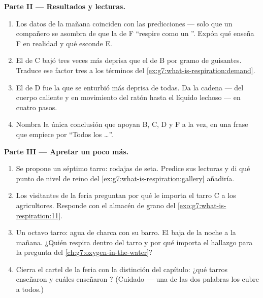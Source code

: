 \begin{problem}
\medskip\noindent\textbf{Parte II --- Resultados y lecturas.}
\begin{enumerate}[resume]
  \item Los datos de la mañana coinciden con las predicciones --- solo
        que un compañero se asombra de que la  de F ``respire
        como un ''. Expón qué enseña F en realidad y qué esconde E.
  \item El  de C bajó tres veces más deprisa que el de B por
        gramo de guisantes. Traduce ese factor tres a los términos del
        \cref{ex:g7:what-is-respiration:demand}.
  \item El  de D fue la que se enturbió más deprisa de
        todas. Da la cadena --- del cuerpo caliente y en movimiento del
        ratón hasta el líquido lechoso --- en cuatro pasos.
  \item Nombra la única conclusión que apoyan B, C, D y F a la vez, en
        una frase que empiece por ``Todos los \dots''.
\end{enumerate}

\medskip\noindent\textbf{Parte III --- Apretar un poco más.}
\begin{enumerate}[resume]
  \item Se propone un séptimo tarro: rodajas de seta. Predice sus
        lecturas y di qué punto de nivel de reino del
        \cref{ex:g7:what-is-respiration:gallery} añadiría.
  \item Los visitantes de la feria preguntan por qué le importa el
        tarro C a los agricultores. Responde con el almacén de grano
        del \cref{exo:g7:what-is-respiration:11}.
  \item Un octavo tarro: agua de charca con su barro. El  baja
        de la noche a la mañana. ¿Quién respira dentro del tarro y por
        qué importa el hallazgo para la pregunta del
        \cref{ch:g7:oxygen-in-the-water}?
  \item Cierra el cartel de la feria con la distinción del capítulo:
        ¿qué tarros enseñaron \emph{} y cuáles enseñaron
        \emph{}? (Cuidado --- una de las dos palabras los
        cubre a todos.)
\end{enumerate}
\end{problem}
